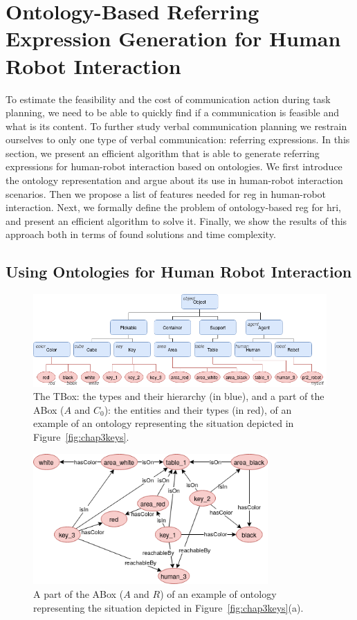 \documentclass[a4paper,11pt,twoside]{StyleThese}
\begin{document}
\section{Ontology-Based Referring Expression Generation for Human Robot Interaction}
To estimate the feasibility and the cost of communication action during task planning, we need to be able to quickly find if a communication is feasible and what is its content. To further study verbal communication planning we restrain ourselves to only one type of verbal communication: referring expressions.
In this section, we present an efficient algorithm that is able to generate referring expressions for human-robot interaction based on ontologies. We first introduce the ontology representation and argue about its use in human-robot interaction scenarios. Then we propose a list of features needed for \acrshort{reg} in human-robot interaction. Next, we formally define the problem of ontology-based \acrshort{reg} for \acrshort{hri}, and present an efficient algorithm to solve it. Finally, we show the results of this approach both in terms of found solutions and time complexity.

\subsection{Using Ontologies for Human Robot Interaction}
\begin{figure}[hbtp]
\centering
\includegraphics[width=\textwidth]{figures/chapter3/AboxTbox.png}
\caption{The TBox: the types and their hierarchy (in blue), and a part of the ABox ($A$ and $C_0$): the entities and their types (in red), of an example of an ontology representing the situation depicted in Figure~\ref{fig:chap3keys}.}
\label{fig:chap3aboxtbox}
\end{figure}

\begin{figure}[hbtp]
\centering
\includegraphics[width=0.8\textwidth]{figures/chapter3/ABoxR.png}
\caption{A part of the ABox ($A$ and $R$) of an example of ontology representing the situation depicted in Figure~\ref{fig:chap3keys}(a).}
\label{fig:chap3aboxrel}
\end{figure}
\end{document}
